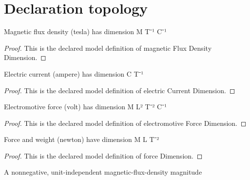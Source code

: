 \section{Declaration topology}
\begin{definition}
  \label{def:physics:phyx-mini-0946:phyxminiproblems-problemphyxmini0946-magneticfluxdensitydimension}
  Magnetic flux density (tesla) has dimension M T⁻¹ C⁻¹
\end{definition}
\begin{proof}
  This is the declared model definition of magnetic Flux Density Dimension.
\end{proof}
\begin{definition}
  \label{def:physics:phyx-mini-0946:phyxminiproblems-problemphyxmini0946-electriccurrentdimension}
  Electric current (ampere) has dimension C T⁻¹
\end{definition}
\begin{proof}
  This is the declared model definition of electric Current Dimension.
\end{proof}
\begin{definition}
  \label{def:physics:phyx-mini-0946:phyxminiproblems-problemphyxmini0946-electromotiveforcedimension}
  Electromotive force (volt) has dimension M L² T⁻² C⁻¹
\end{definition}
\begin{proof}
  This is the declared model definition of electromotive Force Dimension.
\end{proof}
\begin{definition}
  \label{def:physics:phyx-mini-0946:phyxminiproblems-problemphyxmini0946-forcedimension}
  Force and weight (newton) have dimension M L T⁻²
\end{definition}
\begin{proof}
  This is the declared model definition of force Dimension.
\end{proof}
\begin{definition}
  \label{def:physics:phyx-mini-0946:phyxminiproblems-problemphyxmini0946-magneticfluxdensitymagnitude}
  A nonnegative, unit-independent magnetic-flux-density magnitude
\end{definition}
